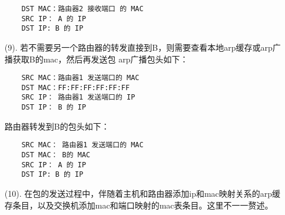 \documentclass[a4paper,left=1.5cm,right=1.5cm,11pt]{article}
\begin{document}
\begin{itemize}
\begin{lstlisting}
	DST MAC：路由器2 接收端口 的 MAC
	SRC IP： A 的 IP
	DST IP: B 的 IP
	\end{lstlisting}
	\item[(9).]若不需要另一个路由器的转发直接到B，则需要查看本地arp缓存或arp广播获取B的mac，然后再发送包
	arp广播包头如下：
	\begin{lstlisting}
	SRC MAC：路由器1 发送端口的 MAC
	DST MAC：FF:FF:FF:FF:FF:FF
	SRC IP： 路由器1 发送端口的 IP
	DST IP： B 的 IP
	\end{lstlisting}
	路由器转发到B的包头如下：
	\begin{lstlisting}
	SRC MAC： 路由器1 发送端口的 MAC
	DST MAC： B的 MAC
	SRC IP： A 的 IP
	DST IP: B 的 IP
	\end{lstlisting}
	\item[(10).]在包的发送过程中，伴随着主机和路由器添加ip和mac映射关系的arp缓存条目，以及交换机添加mac和端口映射的mac表条目。这里不一一赘述。
\end{itemize}
\end{document}
